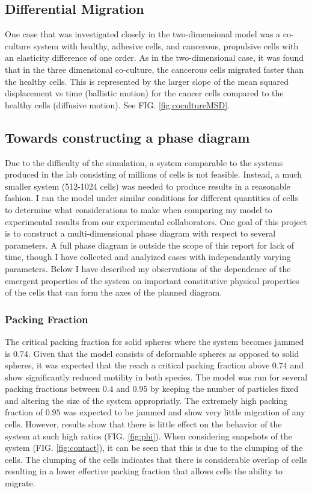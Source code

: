 \documentclass[aps,prb,twocolumn,groupedaddress,nofootinbib,floatfix]{revtex4}
\begin{document}
\subsection{Differential Migration}
One case that was investigated closely in the two-dimensional model was a co-culture system with healthy, adhesive cells, and cancerous, propulsive cells with an elasticity difference of one order.
As in the two-dimensional case, it was found that in the three dimensional co-culture, the cancerous cells migrated faster than the healthy cells.
This is represented by the larger slope of the mean squared displacement vs time (ballistic motion) for the cancer cells compared to the healthy cells (diffusive motion). See FIG. \ref{fig:cocultureMSD}.

\subsection{Towards constructing a phase diagram}

Due to the difficulty of the simulation, a system comparable to the systems produced in the lab consisting of millions of cells is not feasible.
Instead, a much smaller system (512-1024 cells) was needed to produce results in a reasonable fashion. I ran the model under similar conditions for different quantities of cells to determine what considerations to make when comparing my model to experimental results from our experimental collaborators.
One goal of this project is to construct a multi-dimensional phase diagram with respect to several parameters.
A full phase diagram is outside the scope of this report for lack of time, though I have collected and analyized cases with independantly varying parameters.
Below I have described my observations of the dependence of the emergent properties of the system on important constitutive  physical properties of the cells that can form the axes of the planned diagram.

\subsubsection{Packing Fraction}

The critical packing fraction for solid spheres where the system becomes jammed is $0.74$.
Given that the model consists of deformable spheres as opposed to solid spheres, it was expected that the reach a critical packing fraction above $0.74$ and show significantly reduced motility in both species.
The model was run for several packing fractions between $0.4$ and $0.95$ by keeping the number of particles fixed and altering the size of the system appropriatly.
The extremely high packing fraction of $0.95$ was expected to be jammed and show very little migration of any cells.
However, results show that there is little effect on the behavior of the system at such high ratios (FIG. \ref{fig:phi}).
When considering snapshots of the system (FIG. \ref{fig:contact}), it can be seen that this is due to the clumping of the cells.
The clumping of the cells indicates that there is considerable overlap of cells resulting in a lower effective packing fraction that allows cells the ability to migrate.
\end{document}
